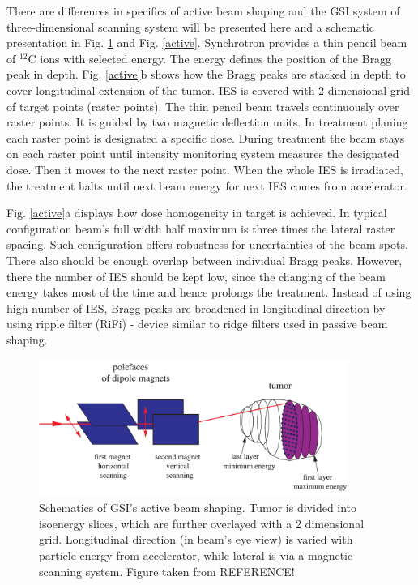 \documentclass[type=dr, dr=rernat, accentcolor=tud7b,colorbacktitle, bigchapter, openright, twoside, 12pt ]{tudthesis}
\begin{document}
There are differences in specifics of active beam shaping and the GSI system of three-dimensional scanning system will be presented here \cite{Haberer1993,Kraft2000,Schardt2010} and a schematic presentation in Fig. \ref{scanning} and Fig. \ref{active}.
Synchrotron provides a thin pencil beam of $^{12}$C ions with selected energy. The energy defines the position of the Bragg peak in depth. Fig. \ref{active}b shows how the Bragg peaks are stacked in depth to cover longitudinal extension of the tumor.
IES is covered with 2 dimensional grid of target points (raster points). The thin pencil beam travels continuously over raster points. It is guided by two magnetic deflection units. In treatment planing each raster point is designated a specific dose. 
During treatment the beam stays on each raster point until intensity monitoring system measures the designated dose. Then it moves to the next raster point. When the whole IES is irradiated, the treatment halts until next beam energy for next IES comes from accelerator.

Fig. \ref{active}a displays how dose homogeneity in target is achieved. In typical configuration beam's full width half maximum is three times the lateral raster spacing. Such configuration offers robustness for uncertainties of the beam spots.
There also should be enough overlap between individual Bragg peaks. However, there the number of IES should be kept low, since the changing of the beam energy takes most of the time and hence prolongs the treatment. Instead of using high number of
 IES, Bragg peaks are broadened in longitudinal direction by using ripple filter (RiFi) - device similar to ridge filters used in passive beam shaping. 



\newpage

\vspace*{0.6cm}

\begin{figure}[H]
\begin{center}
\includegraphics[width=0.9\textwidth]{./Images/therapy.png}
\caption{Schematics of GSI's active beam shaping. Tumor is divided into isoenergy slices, which are further overlayed with a 2 dimensional grid. 
Longitudinal direction (in beam's eye view) is varied with particle energy from accelerator, while lateral is via a magnetic scanning system. Figure taken from REFERENCE!}
\label{scanning}
\end{center}
\end{figure}
\end{document}
